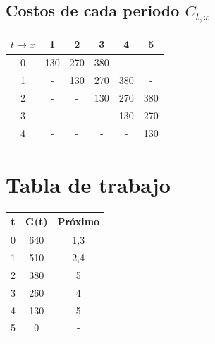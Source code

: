 \documentclass[12pt]{article}
\begin{document}
\newpage
\begin{landscape}
\subsection*{Costos de cada periodo $C_{t,x}$}
\begin{longtable}{|c|c|c|c|c|c|}
\hline
$t \to x$  & 1 & 2 & 3 & 4 & 5 \\\hline\hline
0 & 130 & 270 & 380 & - & - \\\hline
1 & - & 130 & 270 & 380 & - \\\hline
2 & - & - & 130 & 270 & 380 \\\hline
3 & - & - & - & 130 & 270 \\\hline
4 & - & - & - & - & 130 \\\hline
\end{longtable}
\end{landscape}
\section*{Tabla de trabajo}
\begin{tabular}{ccc}\toprule
t & G(t) & Próximo \\\midrule
0 & 640 & 1,3 \\
1 & 510 & 2,4 \\
2 & 380 & 5 \\
3 & 260 & 4 \\
4 & 130 & 5 \\
5 & 0 & - \\
\bottomrule\end{tabular}
\end{document}

